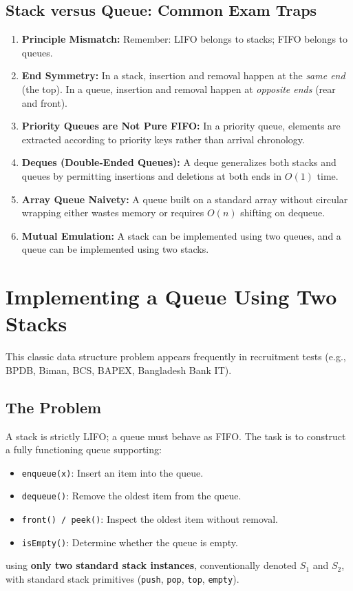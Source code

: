 \subsection{Stack versus Queue: Common Exam Traps}
\begin{enumerate}
    \item \textbf{Principle Mismatch:} Remember: LIFO belongs to stacks; FIFO belongs to queues.
    \item \textbf{End Symmetry:} In a stack, insertion and removal happen at the \emph{same end} (the top). In a queue, insertion and removal happen at \emph{opposite ends} (rear and front).
    \item \textbf{Priority Queues are Not Pure FIFO:} In a priority queue, elements are extracted according to priority keys rather than arrival chronology.
    \item \textbf{Deques (Double-Ended Queues):} A deque generalizes both stacks and queues by permitting insertions and deletions at both ends in $O(1)$ time.
    \item \textbf{Array Queue Naivety:} A queue built on a standard array without circular wrapping either wastes memory or requires $O(n)$ shifting on dequeue.
    \item \textbf{Mutual Emulation:} A stack can be implemented using two queues, and a queue can be implemented using two stacks.
\end{enumerate}

\section{Implementing a Queue Using Two Stacks}

This classic data structure problem appears frequently in recruitment tests (e.g., BPDB, Biman, BCS, BAPEX, Bangladesh Bank IT).

\subsection{The Problem}
A stack is strictly LIFO; a queue must behave as FIFO. The task is to construct a fully functioning queue supporting:
\begin{itemize}
    \item \texttt{enqueue(x)}: Insert an item into the queue.
    \item \texttt{dequeue()}: Remove the oldest item from the queue.
    \item \texttt{front() / peek()}: Inspect the oldest item without removal.
    \item \texttt{isEmpty()}: Determine whether the queue is empty.
\end{itemize}
using \textbf{only two standard stack instances}, conventionally denoted $S_1$ and $S_2$, with standard stack primitives (\texttt{push}, \texttt{pop}, \texttt{top}, \texttt{empty}).

